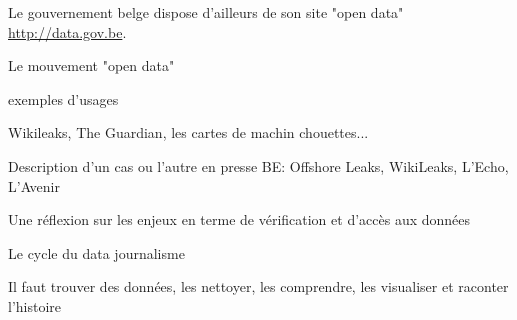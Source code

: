Le gouvernement belge dispose d'ailleurs de son site "open data" \url{http://data.gov.be}.


Le mouvement "open data"

exemples d'usages

Wikileaks, The Guardian, les cartes de machin chouettes...


Description d'un cas ou l'autre en presse BE: Offshore Leaks, WikiLeaks, L'Echo, L'Avenir

Une réflexion sur les enjeux en terme de vérification et d'accès aux données


Le cycle du data journalisme

Il faut trouver des données, les nettoyer, les comprendre, les visualiser et 
raconter l'histoire
